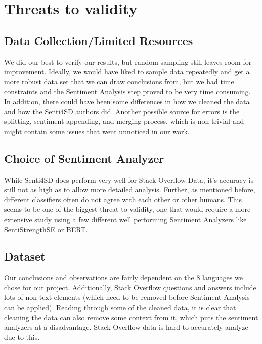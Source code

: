 \documentclass[conference]{IEEEtran}
\begin{document}
\section{Threats to validity}

\subsection{Data Collection/Limited Resources}
We did our best to verify our results, but random sampling still leaves room for improvement. Ideally, we would have liked to sample data repeatedly and get a more robust data set that we can draw conclusions from, but we had time constraints and the Sentiment Analysis step proved to be very time consuming.\\

In addition, there could have been some differences in how we cleaned the data and how the Senti4SD authors did\cite{b18}. Another possible source for errors is the splitting, sentiment appending, and merging process, which is non-trivial and might contain some issues that went unnoticed in our work.\\

\subsection{Choice of Sentiment Analyzer}
While Senti4SD does perform very well for Stack Overflow Data, it's accuracy is still not as high as to allow more detailed analysis. Further, as mentioned before, different classifiers often do not agree with each other or other humans. This seems to be one of the biggest threat to validity, one that would require a more extensive study using a few different well performing Sentiment Analyzers like SentiStrengthSE or BERT. \\

\subsection{Dataset}
Our conclusions and observations are fairly dependent on the 8 languages we chose for our project. Additionally, Stack Overflow questions and answers include lots of non-text elements (which need to be removed before Sentiment Analysis can be applied). Reading through some of the cleaned data, it is clear that cleaning the data can also remove some context from it, which puts the sentiment analyzers at a disadvantage. Stack Overflow data is hard to accurately analyze due to this.\\ 
\end{document}
